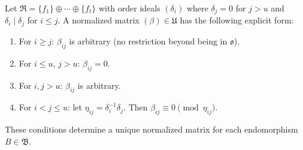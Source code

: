 Let $\mathfrak{R} = \{f_1\} \oplus \cdots \oplus \{f_t\}$ with order ideals $(\delta_i)$ where $\delta_j = 0$ for $j > u$ and $\delta_i \mid \delta_j$ for $i \leq j$. A normalized matrix $(\beta) \in \mathfrak{U}$ has the following explicit form:
\begin{enumerate}
\item For $i \geq j$: $\beta_{ij}$ is arbitrary (no restriction beyond being in $\mathfrak{o}$).
\item For $i \leq u$, $j > u$: $\beta_{ij} = 0$.
\item For $i, j > u$: $\beta_{ij}$ is arbitrary.
\item For $i < j \leq u$: let $\eta_{ij} = \delta_i^{-1} \delta_j$. Then $\beta_{ij} \equiv 0 \pmod{\eta_{ij}}$.
\end{enumerate}
These conditions determine a unique normalized matrix for each endomorphism $B \in \mathfrak{B}$.
